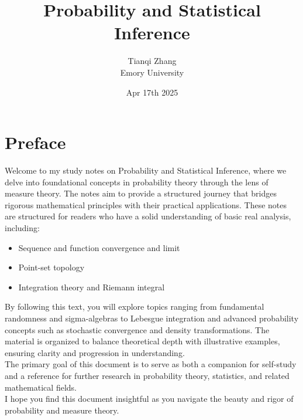 

\title{\textbf{%
               Probability and Statistical Inference}}
\author{Tianqi Zhang\\
Emory University}
\date{Apr 17th 2025}


\maketitle
\newpage
\setcounter{tocdepth}{1} %
\tableofcontents

\newpage
\section*{Preface}
Welcome to my study notes on Probability and Statistical Inference, where we delve into foundational concepts in probability theory through the lens of measure theory. The notes aim to provide a structured journey that bridges rigorous mathematical principles with their practical applications. These notes are structured for readers who have a solid understanding of basic real analysis, including:

\begin{itemize}
    \item Sequence and function convergence and limit
    \item Point-set topology
    \item Integration theory and Riemann integral
\end{itemize}

\noindent By following this text, you will explore topics ranging from fundamental randomness and sigma-algebras to Lebesgue integration and advanced probability concepts such as stochastic convergence and density transformations. The material is organized to balance theoretical depth with illustrative examples, ensuring clarity and progression in understanding.\\

\noindent The primary goal of this document is to serve as both a companion for self-study and a reference for further research in probability theory, statistics, and related mathematical fields.\\

\noindent I hope you find this document insightful as you navigate the beauty and rigor of probability and measure theory.






